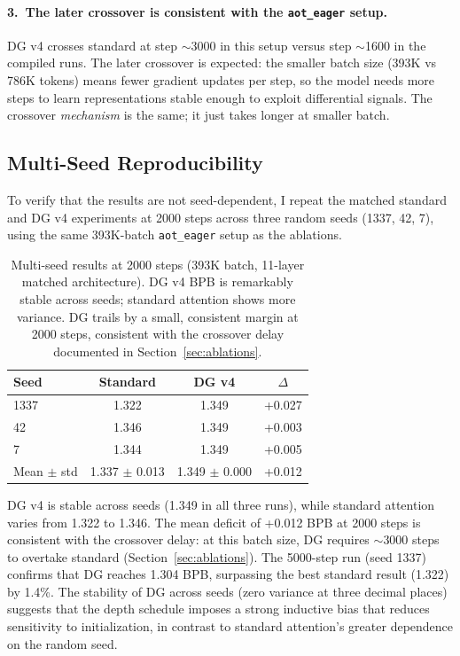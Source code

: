 \documentclass[11pt]{article}
\begin{document}
\paragraph{3.\ The later crossover is consistent with the \texttt{aot\_eager} setup.}
DG v4 crosses standard at step $\sim$3000 in this setup versus step $\sim$1600 in the compiled runs. The later crossover is expected: the smaller batch size (393K vs 786K tokens) means fewer gradient updates per step, so the model needs more steps to learn representations stable enough to exploit differential signals. The crossover \emph{mechanism} is the same; it just takes longer at smaller batch.

\subsection{Multi-Seed Reproducibility}
\label{sec:multiseed}

To verify that the results are not seed-dependent, I repeat the matched standard and DG v4 experiments at 2000 steps across three random seeds (1337, 42, 7), using the same 393K-batch \texttt{aot\_eager} setup as the ablations.

\begin{table}[H]
\centering
\caption{Multi-seed results at 2000 steps (393K batch, 11-layer matched architecture). DG v4 BPB is remarkably stable across seeds; standard attention shows more variance. DG trails by a small, consistent margin at 2000 steps, consistent with the crossover delay documented in Section~\ref{sec:ablations}.}
\label{tab:multiseed}
\begin{tabular}{@{}lccc@{}}
\toprule
Seed & Standard & DG v4 & $\Delta$ \\
\midrule
1337 & 1.322 & 1.349 & +0.027 \\
42   & 1.346 & 1.349 & +0.003 \\
7    & 1.344 & 1.349 & +0.005 \\
\midrule
Mean $\pm$ std & 1.337 $\pm$ 0.013 & 1.349 $\pm$ 0.000 & +0.012 \\
\bottomrule
\end{tabular}
\end{table}

DG v4 is stable across seeds (1.349 in all three runs), while standard attention varies from 1.322 to 1.346. The mean deficit of +0.012 BPB at 2000 steps is consistent with the crossover delay: at this batch size, DG requires $\sim$3000 steps to overtake standard (Section~\ref{sec:ablations}). The 5000-step run (seed 1337) confirms that DG reaches 1.304 BPB, surpassing the best standard result (1.322) by 1.4\%. The stability of DG across seeds (zero variance at three decimal places) suggests that the depth schedule imposes a strong inductive bias that reduces sensitivity to initialization, in contrast to standard attention's greater dependence on the random seed.
\end{document}
